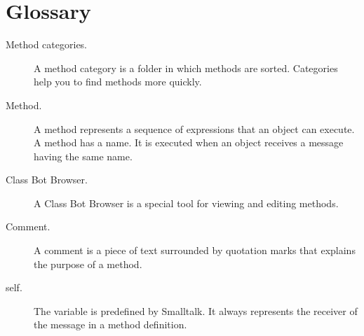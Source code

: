 \documentclass[a4paper,10pt,twoside]{book}
\begin{document}
\section{Glossary} 


\begin{description}
	\item[Method categories.] A method category is a folder in which methods are sorted. Categories 
help you to find methods more quickly. 
	
	\item[Method.] A method represents a sequence of expressions that an object can execute. 
A method has a name. It is executed when an object receives a message having the 
same name. 

\item[Class Bot Browser.] A Class Bot Browser is a special tool for viewing and editing methods. 

\item[Comment.] A comment is a piece of text surrounded by quotation marks that explains the 
purpose of a method. 

\item[self.] The variable  is predefined by Smalltalk. It always represents the receiver of the 
message in a method definition. 
\end{description}

\ifx\wholebook\relax\else
    
\end{document}
